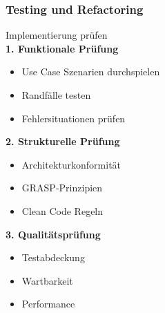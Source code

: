 \columnbreak

\subsubsection{Testing und Refactoring}

\begin{KR}{Implementierung prüfen}\\
\textbf{1. Funktionale Prüfung}
\begin{itemize}
    \item Use Case Szenarien durchspielen
    \item Randfälle testen
    \item Fehlersituationen prüfen
\end{itemize}

\textbf{2. Strukturelle Prüfung}
\begin{itemize}
    \item Architekturkonformität
    \item GRASP-Prinzipien
    \item Clean Code Regeln
\end{itemize}

\textbf{3. Qualitätsprüfung}
\begin{itemize}
    \item Testabdeckung
    \item Wartbarkeit
    \item Performance
\end{itemize}
\end{KR}







